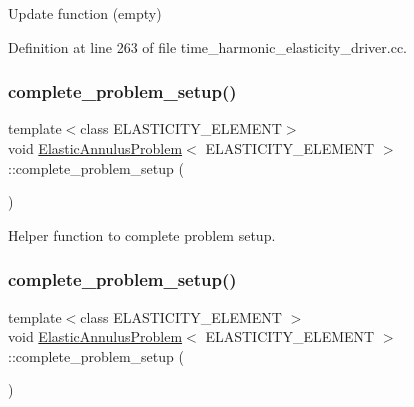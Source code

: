 Update function (empty) 



Definition at line 263 of file time\+\_\+harmonic\+\_\+elasticity\+\_\+driver.\+cc.

\mbox{\label{classElasticAnnulusProblem_a06d509ff3316e5f3072ad5f9144cc33f}} 
\subsubsection{\texorpdfstring{complete\+\_\+problem\+\_\+setup()}{complete\_problem\_setup()}\hspace{0.1cm}{\footnotesize\ttfamily [1/2]}}
{\footnotesize\ttfamily template$<$class E\+L\+A\+S\+T\+I\+C\+I\+T\+Y\+\_\+\+E\+L\+E\+M\+E\+NT$>$ \\
void \hyperlink{classElasticAnnulusProblem}{Elastic\+Annulus\+Problem}$<$ E\+L\+A\+S\+T\+I\+C\+I\+T\+Y\+\_\+\+E\+L\+E\+M\+E\+NT $>$\+::complete\+\_\+problem\+\_\+setup (\begin{DoxyParamCaption}{ }\end{DoxyParamCaption})\hspace{0.3cm}{\ttfamily [private]}}



Helper function to complete problem setup. 

\mbox{\label{classElasticAnnulusProblem_a06d509ff3316e5f3072ad5f9144cc33f}} 
\subsubsection{\texorpdfstring{complete\+\_\+problem\+\_\+setup()}{complete\_problem\_setup()}\hspace{0.1cm}{\footnotesize\ttfamily [2/2]}}
{\footnotesize\ttfamily template$<$class E\+L\+A\+S\+T\+I\+C\+I\+T\+Y\+\_\+\+E\+L\+E\+M\+E\+NT $>$ \\
void \hyperlink{classElasticAnnulusProblem}{Elastic\+Annulus\+Problem}$<$ E\+L\+A\+S\+T\+I\+C\+I\+T\+Y\+\_\+\+E\+L\+E\+M\+E\+NT $>$\+::complete\+\_\+problem\+\_\+setup (\begin{DoxyParamCaption}{ }\end{DoxyParamCaption})\hspace{0.3cm}{\ttfamily [private]}}



